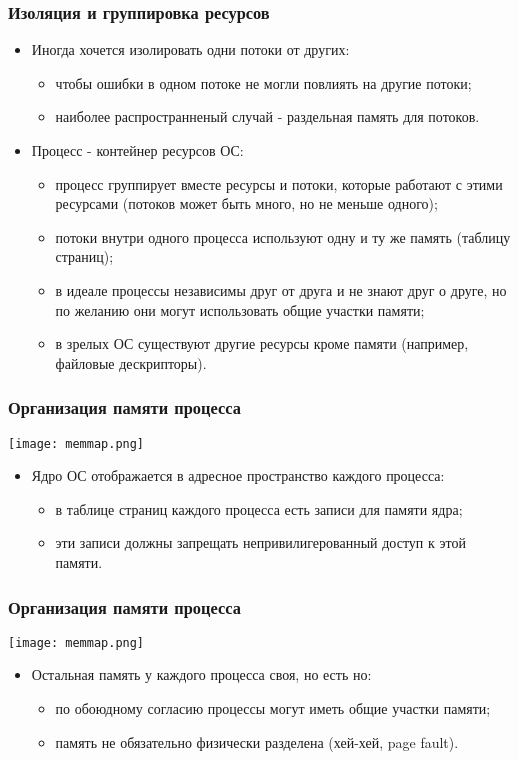 \begin{frame}
\frametitle{Изоляция и группировка ресурсов}
\begin{itemize}
  \item Иногда хочется изолировать одни потоки от других:
  \begin{itemize}
    \item чтобы ошибки в одном потоке не могли повлиять на другие потоки;
    \item наиболее распространненый случай - раздельная память для потоков.
  \end{itemize}
  \item Процесс - контейнер ресурсов ОС:
  \begin{itemize}
    \item процесс группирует вместе ресурсы и потоки, которые работают с этими
    ресурсами (потоков может быть много, но не меньше одного);
    \item потоки внутри одного процесса используют одну и ту же память (таблицу
    страниц);
    \item в идеале процессы независимы друг от друга и не знают друг о друге,
    но по желанию они могут использовать общие участки памяти;
    \item в зрелых ОС существуют другие ресурсы кроме памяти (например, файловые
    дескрипторы).
  \end{itemize}
\end{itemize}
\end{frame}

\begin{frame}
\frametitle{Организация памяти процесса}
\begin{center}
  \texttt{[image: memmap.png]}
\end{center}
\begin{itemize}
  \item Ядро ОС отображается в адресное пространство каждого процесса:
  \begin{itemize}
    \item в таблице страниц каждого процесса есть записи для памяти ядра;
    \item эти записи должны запрещать непривилигерованный доступ к этой памяти.
  \end{itemize}
\end{itemize}
\end{frame}

\begin{frame}
\frametitle{Организация памяти процесса}
\begin{center}
  \texttt{[image: memmap.png]}
\end{center}
\begin{itemize}
  \item Остальная память у каждого процесса своя, но есть но:
  \begin{itemize}
    \item по обоюдному согласию процессы могут иметь общие участки памяти;
    \item память не обязательно физически разделена (хей-хей, page fault).
  \end{itemize}
\end{itemize}
\end{frame}

